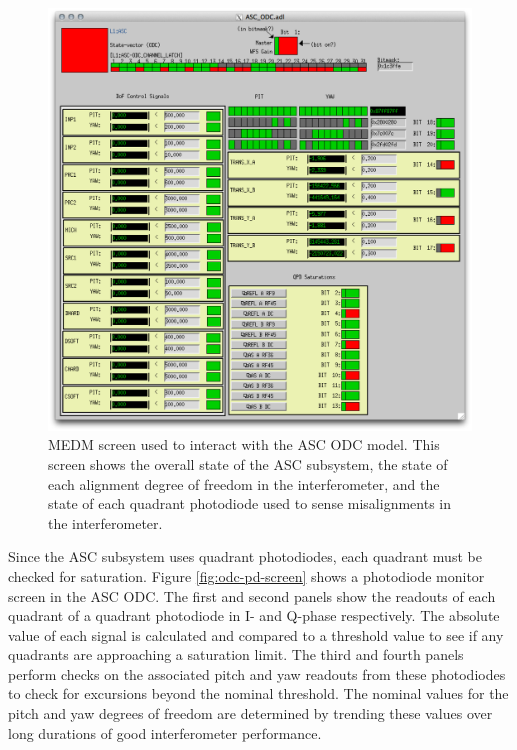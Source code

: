 \begin{figure}[ht!]
\includegraphics[width=\textwidth]{figures/ODC/ASC_screen}
\caption[ASC ODC Overview Screen]{MEDM screen used to interact with the ASC ODC model. %
         This screen shows the overall state of the ASC subsystem, the state of each %
         alignment degree of freedom in the interferometer, and the state of each %
         quadrant photodiode used to sense misalignments in the interferometer.}
\label{fig:asc-odc}
\end{figure}

Since the ASC subsystem uses quadrant photodiodes, each quadrant must be checked 
for saturation. 
Figure \ref{fig:odc-pd-screen} shows a photodiode monitor screen in the ASC ODC. 
The first and second panels show the readouts of each quadrant of a quadrant 
photodiode in I- and Q-phase respectively. The absolute value of each signal is 
calculated and compared to a threshold value to see if any quadrants are approaching 
a saturation limit. The third and fourth panels perform checks on the associated 
pitch and yaw readouts from these photodiodes to check for excursions beyond the 
nominal threshold. The nominal values for the pitch and yaw degrees of freedom 
are determined by trending these values over long durations of good interferometer 
performance.

